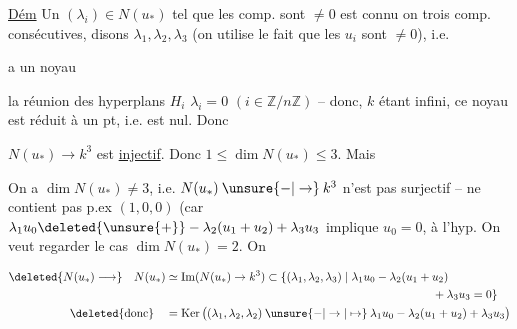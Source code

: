 

\uline{Dém} Un $(\lambda_i)\in N(u_*)$ tel que les comp. sont $\ne0$ est connu  on  trois comp. consécutives, disons $\lambda_1,\lambda_2,\lambda_3$ (on utilise le fait que les $u_i$ sont $\ne0$),  i.e.


a un noyau


\uline{}\quad {}   la réunion des hyperplans $H_i$    $\lambda_i=0$ $(i\in\mathbb Z/n\mathbb Z)$ -- donc, $k$ étant infini,  ce noyau est réduit à un pt, i.e. est nul. Donc

$N(u_*)\to k^3$ est \uline{injectif}. Donc $1\leq\dim N(u_*)\leq3$. Mais 

On a $\dim N(u_*)\ne3$, i.e. $N(u_*)\mathbin{\unsure{-|\to}}k^3$ n'est pas surjectif --   ne contient pas p.ex $(1,0,0)$ (car $\lambda_1u_0\deleted{\unsure{+}}-\lambda_2(u_1+u_2)+\lambda_3u_3$ implique $u_0=0$,  à l'hyp. On veut regarder le cas $\dim N(u_*)=2$. On

{\small
\[
\begin{aligned}
\deleted{N(u_*)\longrightarrow}\quad N(u_*)&\simeq\operatorname{Im}(N(u_*)\to k^3)
 \subset\{(\lambda_1,\lambda_2,\lambda_3)\mid\lambda_1u_0-\lambda_2(u_1+u_2)\\
&\hspace{23em}+\lambda_3u_3=0\}\\
\deleted{\text{donc}}\quad &=\operatorname{Ker}\big((\lambda_1,\lambda_2,\lambda_2)\mathbin{\unsure{-|\to|\mapsto}}\lambda_1u_0-\lambda_2(u_1+u_2)+\lambda_3u_3\big)
\end{aligned}
\]
}

